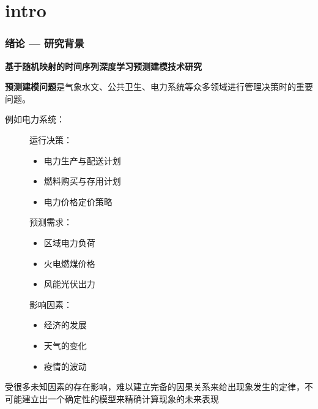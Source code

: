 \section{intro}

\begin{frame}
    \frametitle{绪论 — 研究背景}

    \textbf{基于随机映射的时间序列深度学习预测建模技术研究}

    \vspace*{1em}
    \textbf{预测建模问题}是气象水文、公共卫生、电力系统等众多领域进行管理决策时的重要问题。

    例如电力系统：
    \begin{figure}
        \begin{minipage}[b]{0.32\textwidth}
            运行决策：
            \begin{itemize}
                \item 电力生产与配送计划
                \item 燃料购买与存用计划
                \item 电力价格定价策略
            \end{itemize}
        \end{minipage}
        \hspace{1em}
        \begin{minipage}[b]{0.32\textwidth}
            预测需求：
            \begin{itemize}
                \item 区域电力负荷
                \item 火电燃煤价格
                \item 风能光伏出力
            \end{itemize}
        \end{minipage}
        \hfill
        \begin{minipage}[b]{0.3\textwidth}
            影响因素：
            \begin{itemize}
                \item 经济的发展
                \item 天气的变化
                \item 疫情的波动
            \end{itemize}
        \end{minipage}
    \end{figure}

    受很多未知因素的存在影响，难以建立完备的因果关系来给出现象发生的定律，不可能建立出一个确定性的模型来精确计算现象的未来表现

\end{frame}
